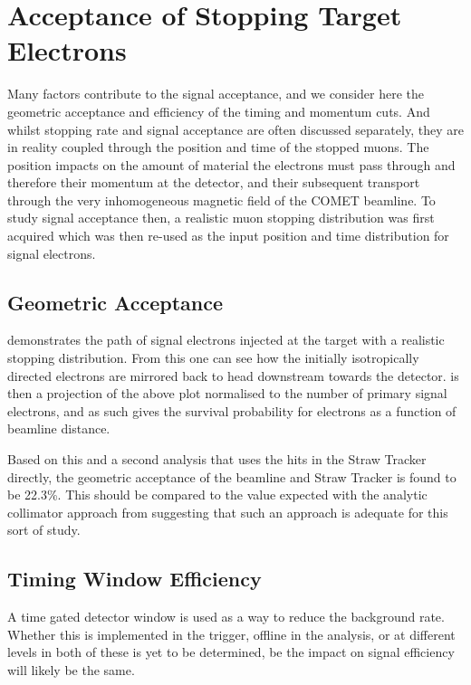 \section{Acceptance of Stopping Target Electrons}
\FigSensGeomAccept
Many factors contribute to the signal acceptance, and we consider here the geometric acceptance and efficiency of the timing and momentum cuts.
And whilst stopping rate and signal acceptance are often discussed separately, they are in reality coupled through the position and time of the stopped muons.
The position impacts on the amount of material the electrons must pass through and therefore their momentum at the detector, and their subsequent transport through the very inhomogeneous magnetic field of the COMET beamline.
To study signal acceptance then, a realistic muon stopping distribution was first acquired which was then re-used as the input position and time distribution for signal electrons.

\subsection{Geometric Acceptance}
 demonstrates the path of signal electrons injected at the target with a realistic stopping distribution.
From this one can see how the initially isotropically directed electrons are mirrored back to head downstream towards the detector.
 is then a projection of the above plot normalised to the number of primary signal electrons, and as such gives the survival probability for electrons as a function of beamline distance.

Based on this and a second analysis that uses the hits in the Straw Tracker directly, the geometric acceptance of the beamline and Straw Tracker is found to be 22.3\%.
This should be compared to the value expected with the analytic collimator approach from  suggesting that such an approach is adequate for this sort of study.

\subsection{Timing Window Efficiency}
\FigSensTiming
A time gated detector window is used as a way to reduce the background rate. 
Whether this is implemented in the trigger, offline in the analysis, or at different levels in both of these is yet to be determined, be the impact on signal efficiency will likely be the same.

